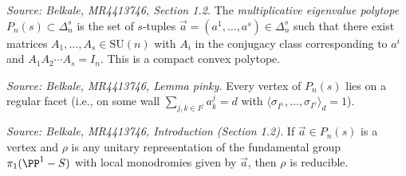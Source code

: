 \begin{definition}[MultiplicativeEigenvaluePolytope]
  \label{def:multiplicative-eigenvalue-polytope}
  \textit{Source: Belkale, MR4413746, Section 1.2.}
  The \emph{multiplicative eigenvalue polytope} \(P_n(s) \subset \Delta_n^s\) is the set of \(s\)-tuples \(\vec{a} = (a^1, \ldots, a^s) \in \Delta_n^s\) such that there exist matrices \(A_1, \ldots, A_s \in \mathrm{SU}(n)\) with \(A_i\) in the conjugacy class corresponding to \(a^i\) and \(A_1 A_2 \cdots A_s = I_n\). This is a compact convex polytope.
\end{definition}

\begin{lemma}[VerticesOnRegularFaces]
  \label{lem:pinky}
  \textit{Source: Belkale, MR4413746, Lemma pinky.}
  Every vertex of \(P_n(s)\) lies on a regular facet (i.e., on some wall \(\sum_{j,k \in I^j} a_k^j = d\) with \(\langle \sigma_{I^1}, \ldots, \sigma_{I^s} \rangle_d = 1\)).
\end{lemma}

\begin{remark}[VertexReducible]
  \label{rem:vertex-reducible}
  \textit{Source: Belkale, MR4413746, Introduction (Section 1.2).}
  If \(\vec{a} \in P_n(s)\) is a vertex and \(\rho\) is any unitary representation of the fundamental group \(\pi_1(\PP^1 - S)\) with local monodromies given by \(\vec{a}\), then \(\rho\) is reducible.
\end{remark}

